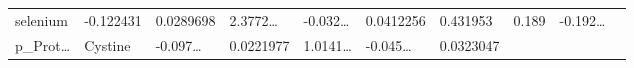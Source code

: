 \documentclass[
]{article}
\begin{document}
\begin{longtable}[]{@{}llllllllll@{}}
\begin{minipage}[t]{0.07\columnwidth}
selenium\strut
\end{minipage} & \begin{minipage}[t]{0.07\columnwidth}\raggedright
-0.122431\strut
\end{minipage} & \begin{minipage}[t]{0.07\columnwidth}\raggedright
0.0289698\strut
\end{minipage} & \begin{minipage}[t]{0.07\columnwidth}\raggedright
2.3772\ldots{}\strut
\end{minipage} & \begin{minipage}[t]{0.07\columnwidth}\raggedright
-0.032\ldots{}\strut
\end{minipage} & \begin{minipage}[t]{0.07\columnwidth}\raggedright
0.0412256\strut
\end{minipage} & \begin{minipage}[t]{0.07\columnwidth}\raggedright
0.431953\strut
\end{minipage} & \begin{minipage}[t]{0.07\columnwidth}\raggedright
0.189\strut
\end{minipage} & \begin{minipage}[t]{0.07\columnwidth}\raggedright
-0.192\ldots{}\strut
\end{minipage}\tabularnewline
\begin{minipage}[t]{0.07\columnwidth}\raggedright
p\_Prot\ldots{}\strut
\end{minipage} & \begin{minipage}[t]{0.07\columnwidth}\raggedright
Cystine\strut
\end{minipage} & \begin{minipage}[t]{0.07\columnwidth}\raggedright
-0.097\ldots{}\strut
\end{minipage} & \begin{minipage}[t]{0.07\columnwidth}\raggedright
0.0221977\strut
\end{minipage} & \begin{minipage}[t]{0.07\columnwidth}\raggedright
1.0141\ldots{}\strut
\end{minipage} & \begin{minipage}[t]{0.07\columnwidth}\raggedright
-0.045\ldots{}\strut
\end{minipage} & \begin{minipage}[t]{0.07\columnwidth}\raggedright
0.0323047\strut
\end{minipage} & \begin{minipage}[t]{0.07\columnwidth}\raggedright

\end{minipage}
\end{longtable}
\end{document}
